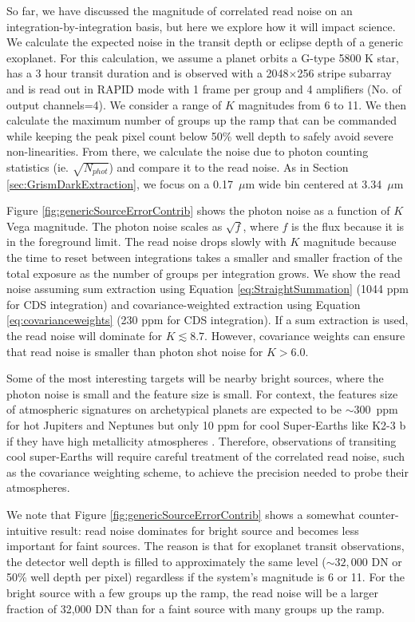 \documentclass[]{aastex62}
\begin{document}
So far, we have discussed the magnitude of correlated read noise on an integration-by-integration basis, but here we explore how it will impact science.
We calculate the expected noise in the transit depth or eclipse depth of a generic exoplanet.
For this calculation, we assume a planet orbits a G-type 5800 K star, has a 3 hour transit duration and is observed with a 2048$\times$256 stripe subarray and is read out in RAPID mode with 1 frame per group and 4 amplifiers (No. of output channels=4).
We consider a range of $K$ magnitudes from 6 to 11.
We then calculate the maximum number of groups up the ramp that can be commanded while keeping the peak pixel count below 50\% well depth to safely avoid severe non-linearities.
From there, we calculate the noise due to photon counting statistics (ie. $\sqrt{N_{phot}}$) and compare it to the read noise.
As in Section \ref{sec:GrismDarkExtraction}, we focus on a 0.17~$\mu$m wide bin centered at 3.34~$\mu$m

Figure \ref{fig:genericSourceErrorContrib} shows the photon noise as a function of $K$ Vega magnitude.
The photon noise scales as $\sqrt{f}$, where $f$ is the flux because it is in the foreground limit.
The read noise drops slowly with $K$ magnitude because the time to reset between integrations takes a smaller and smaller fraction of the total exposure as the number of groups per integration grows.
We show the read noise assuming sum extraction using Equation \ref{eq:StraightSummation} (1044 ppm for CDS integration) and covariance-weighted extraction using Equation \ref{eq:covarianceweights} (230 ppm for CDS integration).
If a sum extraction is used, the read noise will dominate for $K \lesssim 8.7$.
However, covariance weights can ensure that read noise is smaller than photon shot noise for $K > 6.0$.

Some of the most interesting targets will be nearby bright sources, where the photon noise is small and the feature size is small.
For context, the features size of atmospheric signatures on archetypical planets are expected to be $\sim$300~ppm for hot Jupiters and Neptunes but only 10 ppm for cool Super-Earths like K2-3 b if they have high metallicity atmospheres \citep{greene2016jwst_trans}.
Therefore, observations of transiting cool super-Earths will require careful treatment of the correlated read noise, such as the covariance weighting scheme, to achieve the precision needed to probe their atmospheres.


We note that Figure \ref{fig:genericSourceErrorContrib} shows a somewhat counter-intuitive result: read noise dominates for bright source and becomes less important for faint sources.
The reason is that for exoplanet transit observations, the detector well depth is filled to approximately the same level ($\sim 32,000$ DN or 50\% well depth per pixel) regardless if the system's magnitude is 6 or 11.
For the bright source with a few groups up the ramp, the read noise will be a larger fraction of 32,000 DN than for a faint source with many groups up the ramp.
\end{document}
